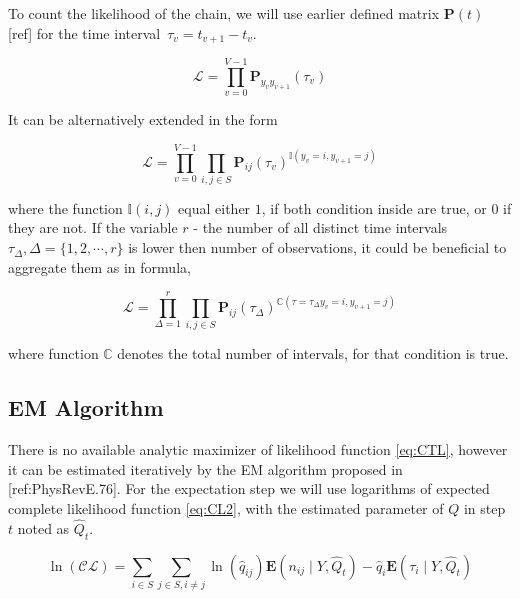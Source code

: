 \documentclass[thesis=M,english]{FITthesis}[2012/10/20]
\newcommand{\matr}[1]{\mathbf{#1}}
\begin{document}
To count the likelihood of the chain, we will use earlier defined matrix $\matr{P}(t)$ [ref] for the time interval~$\tau_v = t_{v+1} - t_v$.    

\begin{equation}
 \mathcal{L} = \prod_{v=0}^{V-1} \matr{P}_{y_v y_{v+1}}(\tau_v) 
\end{equation}

It can be alternatively extended in the form

\begin{equation}
 \mathcal{L} = \prod_{v=0}^{V-1} \prod_{i,j \in S}  \matr{P}_{ij}(\tau_v)^{\mathbb{I}( y_v = i, y_{v+1} = j )} 
\end{equation}

where the function $\mathbb{I}(i,j)$ equal either $1$, if both condition inside are true, or $0$ if they are not. 
If the variable $r$ - the number of all distinct time intervals $\tau_{\Delta}, \Delta =\{1,2,\cdots,r\}$ is lower then number of observations, it could be beneficial to aggregate them as in formula,

\begin{equation}\label{eq:CTL}
 \mathcal{L} = \prod_{\Delta = 1}^{r} \prod_{i,j \in S}  \matr{P}_{ij}(\tau_{\Delta})^{\mathbb{C}( \tau=\tau_{\Delta} y_v = i, y_{v+1} = j )} 
\end{equation}

where function $\mathbb{C}$ denotes the total number of intervals, for that condition is true.
    
    
\subsection{EM Algorithm} 

There is no available analytic maximizer of likelihood function \eqref{eq:CTL}, however it can be estimated iteratively by the EM algorithm proposed in [ref:PhysRevE.76].  
For the expectation step we will use logarithms of expected complete likelihood function \eqref{eq:CL2}, with the estimated parameter of $Q$ in step $t$ noted as $\hat Q_t $.

\begin{equation}\label{eq:EMCL}
 \ln( \mathcal{CL} ) = \sum_{i \in S} \sum_{j \in S, i \neq j} \ln( \hat q_{ij}) \mathbf{E}( n_{ij} \mid Y, \hat Q_t ) - \hat q_i \mathbf{E}( \tau_i \mid Y, \hat Q_t )
\end{equation}
\end{document}
